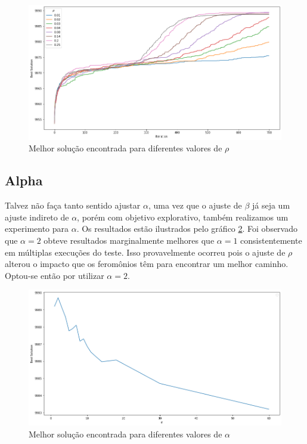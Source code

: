 \documentclass[10pt,twocolumn,letterpaper]{article}
\begin{document}
\begin{figure}[H]
   \begin{center}
      \includegraphics[width=\linewidth]{rho}
   \end{center}
   \caption{Melhor solução encontrada para diferentes valores de $\rho$}
   \label{fig:rho}
\end{figure}

\subsection{Alpha}

Talvez não faça tanto sentido ajustar $\alpha$, uma vez que o ajuste de $\beta$ já seja um ajuste indireto de $\alpha$, porém com objetivo explorativo, também realizamos um experimento para $\alpha$. Os resultados estão ilustrados pelo gráfico \ref{fig:alpha}. Foi observado que $\alpha=2$ obteve resultados marginalmente melhores que $\alpha=1$ consistentemente em múltiplas execuções do teste. Isso provavelmente ocorreu pois o ajuste de $\rho$ alterou o impacto que os feromônios têm para encontrar um melhor caminho. Optou-se então por utilizar $\alpha=2$.

\begin{figure}[H]
   \begin{center}
      \includegraphics[width=\linewidth]{alpha}
   \end{center}
   \caption{Melhor solução encontrada para diferentes valores de $\alpha$}
   \label{fig:alpha}
\end{figure}
\end{document}
